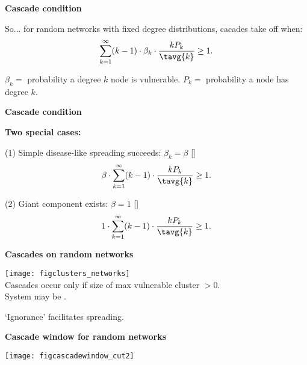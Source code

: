 {{{{    

  

     \textbf{Cascade condition}

    
      So... for random networks with fixed degree distributions,
      cacades take off when:
      $$
      \sum_{k=1}^{\infty}
      (k-1) 
      \cdot
      \beta_k 
      \cdot
      \frac{k P_k}{\tavg{k}} \ge 1.
      $$
      
       $\beta_k =$ probability a degree $k$ node is vulnerable.
       $P_k =$ probability a node has degree $k$.
      
    



     \textbf{Cascade condition}

    \textbf{Two special cases:}
      
       
        (1) Simple disease-like spreading succeeds: $\beta_k = \beta$
      []
        $$
        \beta 
        \cdot 
        \sum_{k=1}^{\infty} 
        (k-1) 
        \cdot 
        \frac{k P_k}{\tavg{k}}\ge 1.
        $$
       
        (2) Giant component exists: $\beta = 1$
      []
        $$
        1 \cdot
        \sum_{k=1}^{\infty} 
        (k-1) 
        \cdot 
        \frac{k P_k}{\tavg{k}}
        \ge 1.
        $$
      
    





  \textbf{Cascades on random networks}
  
          
      \texttt{[image: figclusters\_networks]}\\
      
      
       Cascades occur only if size of max vulnerable cluster $>0$.\\
       
        System may be .\nocite{carlson1999a,carlson2000a,sornette2003a}
       
        \alert{`Ignorance'} facilitates spreading.
      
      

%    


  \textbf{Cascade window for random networks}

  \begin{center}
  \texttt{[image: figcascadewindow\_cut2]}
  \end{center}

}}}}
